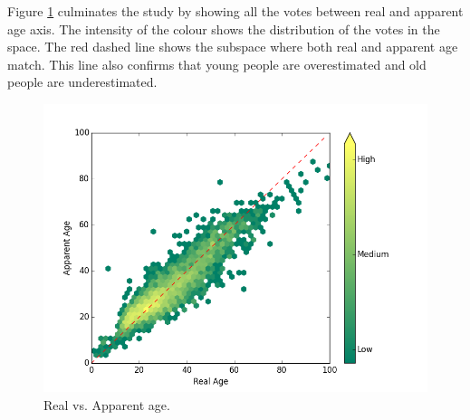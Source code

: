 Figure \ref{fig:RvsA} culminates the study by showing all the votes between real and apparent age axis. The intensity of the colour shows the distribution of the votes in the space. The red dashed line shows the subspace where both real and apparent age match. This line also confirms that young people are overestimated and old people are underestimated.

\begin{figure}[h!]
	\centering
	\includegraphics[width=\textwidth]{figures/real_vs_apparent_summer}
	\caption{Real vs. Apparent age.}
	\label{fig:RvsA}
\end{figure}

